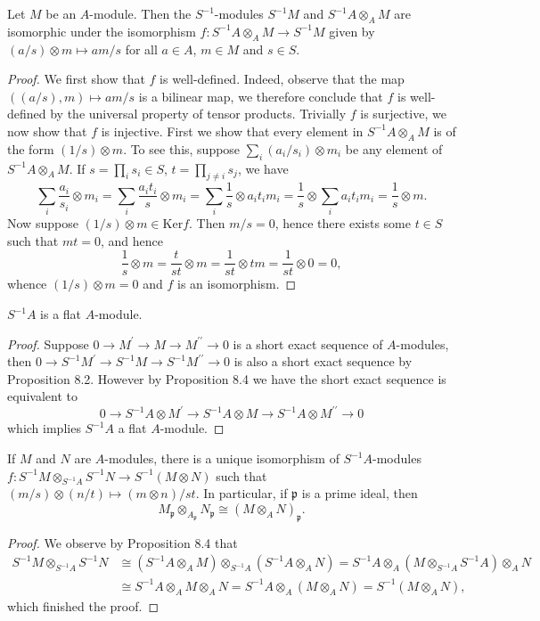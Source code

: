 \begin{proposition}
Let $M$ be an $A$-module. Then the $S^{-1}$-modules $S^{-1}M$ and $S^{-1}A\otimes_AM$ are isomorphic under the isomorphism $f:S^{-1}A\otimes_AM\to S^{-1}M$ given by $(a/s)\otimes m\mapsto am/s$ for all $a\in A$, $m\in M$ and $s\in S$.
\end{proposition}
\begin{proof}
We first show that $f$ is well-defined. Indeed, observe that the map $((a/s),m)\mapsto am/s$ is a bilinear map, we therefore conclude that $f$ is well-defined by the universal property of tensor products. Trivially $f$ is surjective, we now show that $f$ is injective. First we show that every element in $S^{-1}A\otimes_AM$ is of the form $(1/s)\otimes m$. To see this, suppose $\sum_i(a_i/s_i)\otimes m_i$ be any element of $S^{-1}A\otimes_AM$. If $s=\prod_is_i\in S$, $t=\prod_{j\ne i}s_j$, we have 
$$
\sum_i{\frac{a_i}{s_i}\otimes m_i}=\sum_i{\frac{a_it_i}{s}\otimes m_i}=\sum_i{\frac{1}{s}\otimes a_it_im_i}=\frac{1}{s}\otimes \sum_i{a_it_im_i}=\frac{1}{s}\otimes m.
$$
Now suppose $(1/s)\otimes m\in\mathrm{Ker}f$. Then $m/s=0$, hence there exists some $t\in S$ such that $mt=0$, and hence 
$$
\frac{1}{s}\otimes m=\frac{t}{st}\otimes m=\frac{1}{st}\otimes tm=\frac{1}{st}\otimes 0=0,
$$
whence $(1/s)\otimes m=0$ and $f$ is an isomorphism.
\end{proof}
\begin{corollary}
$S^{-1}A$ is a flat $A$-module.
\end{corollary}
\begin{proof}
Suppose $0\longrightarrow M^{\prime}\longrightarrow M\longrightarrow M^{\prime\prime}\longrightarrow 0$ is a short exact sequence of $A$-modules, then $0\longrightarrow S^{-1}M^{\prime}\longrightarrow S^{-1}M\longrightarrow S^{-1}M^{\prime\prime}\longrightarrow 0$ is also a short exact sequence by Proposition 8.2. However by Proposition 8.4 we have the short exact sequence is equivalent to 
$$
0\longrightarrow S^{-1}A\otimes M^{\prime}\longrightarrow S^{-1}A\otimes M\longrightarrow S^{-1}A\otimes M^{\prime\prime}\longrightarrow 0
$$
which implies $S^{-1}A$ a flat $A$-module.
\end{proof}
\begin{proposition}
If $M$ and $N$ are $A$-modules, there is a unique isomorphism of $S^{-1}A$-modules $f:S^{-1}M\otimes_{S^{-1}A}S^{-1}N\to S^{-1}(M\otimes N)$ such that $(m/s)\otimes(n/t)\mapsto(m\otimes n)/st$. In particular, if $\mathfrak{p}$ is a prime ideal, then 
$$
M_{\mathfrak{p}}\otimes _{A_{\mathfrak{p}}}N_{\mathfrak{p}}\cong \left( M\otimes _AN \right) _{\mathfrak{p}}.
$$
\end{proposition}
\begin{proof}
We observe by Proposition 8.4 that 
$$
\begin{aligned}
S^{-1}M\otimes _{S^{-1}A}S^{-1}N&\cong \left( S^{-1}A\otimes _AM \right) \otimes _{S^{-1}A}\left( S^{-1}A\otimes _AN \right) =S^{-1}A\otimes _A\left( M\otimes _{S^{-1}A}S^{-1}A \right) \otimes _AN
\\
&\cong S^{-1}A\otimes _AM\otimes _AN=S^{-1}A\otimes _A\left( M\otimes _AN \right) =S^{-1}\left( M\otimes _AN \right) ,
\end{aligned}
$$
which finished the proof.
\end{proof}
